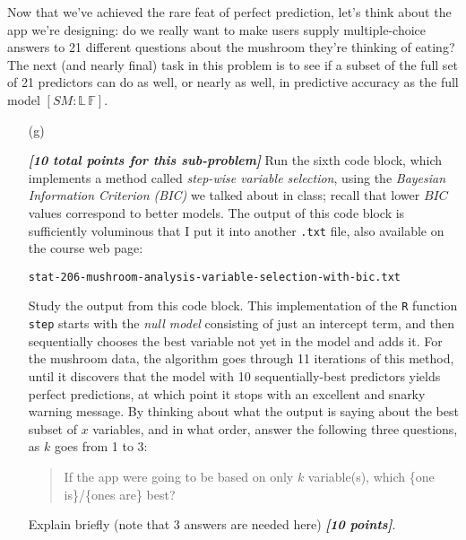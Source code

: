 \documentclass[12pt]{article}
\newcommand{\bi}[1]{\textbf{\textit{#1}}}
\begin{document}
Now that we've achieved the rare feat of perfect prediction, let's think about the app we're designing: do we really want to make users supply multiple-choice answers to 21 different questions about the mushroom they're thinking of eating?
The next (and nearly final) task in this problem is to see if a subset of the full set of 21 predictors can do as well, or nearly as well, in predictive accuracy as the full model $[ SM \! \! : \! \mathbb{ L } \, \mathbb{ F } ]$.

\begin{itemize}

\item[(g)]

\bi{[10 total points for this sub-problem]} Run the sixth code block, which implements a method called \textit{step-wise variable selection}, using the \textit{Bayesian Information Criterion (BIC)} we talked about in class; recall that lower $BIC$ values correspond to better models. The output of this code block is sufficiently voluminous that I put it into another \texttt{.txt} file, also available on the course web page:

\hspace*{0.75in} \texttt{stat-206-mushroom-analysis-variable-selection-with-bic.txt}

Study the output from this code block. This implementation of the \texttt{R} function \texttt{step} starts with the \textit{null model} consisting of just an intercept term, and then sequentially chooses the best variable not yet in the model and adds it. For the mushroom data, the algorithm goes through 11 iterations of this method, until it discovers that the model with 10 sequentially-best predictors yields perfect predictions, at which point it stops with an excellent and snarky warning message. By thinking about what the output is saying about the best subset of $x$ variables, and in what order, answer the following three questions, as $k$ goes from 1 to 3: 

\begin{quote}

If the app were going to be based on only $k$ variable(s), which \{one is\}/\{ones are\} best?

\end{quote}

Explain briefly (note that 3 answers are needed here) \bi{[10 points]}. 

\begin{table}[t!]

\centering


\end{table}
\end{itemize}
\end{document}
